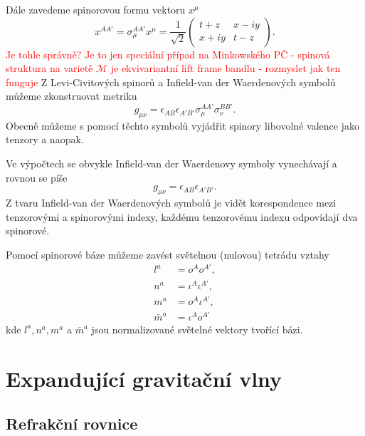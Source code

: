 Dále zavedeme spinorovou formu vektoru $x^\mu$
\begin{equation}
    x^{AA'} = \sigma_\mu^{AA'} x^\mu = \frac{1}{\sqrt{2}} \begin{pmatrix}
        t + z & x - iy \\
        x + iy & t - z
    \end{pmatrix}.
\end{equation}
\textcolor{red}{Je tohle správně? Je to jen speciální případ na Minkowského PČ - spinová
struktura na varietě $\mathcal{M}$ je ekvivariantní lift frame bandlu - rozmyslet jak ten
funguje}
Z Levi-Civitových spinorů a Infield-van der Waerdenových symbolů můžeme zkonstruovat metriku
\begin{equation}
    g_{\mu \nu} = \epsilon_{AB} \epsilon_{A'B'} \sigma_\mu^{AA'} \sigma_\nu^{BB'}.
\end{equation}
Obecně můžeme s pomocí těchto symbolů vyjádřit spinory libovolné valence jako tenzory a
naopak.

Ve výpočtech se obvykle Infield-van der Waerdenovy symboly vynechávají a rovnou se píše
\begin{equation}
    g_{\mu \nu} = \epsilon_{AB}\epsilon_{A'B'}.
\end{equation}
Z tvaru Infield-van der Waerdenových symbolů je vidět korespondence mezi tenzorovými a spinorovými indexy,
každému tenzorovému indexu odpovídají dva spinorové.

Pomocí spinorové báze můžeme zavést světelnou (nulovou) tetrádu vztahy
\begin{equation}
    \begin{split}
        l^a &= o^A o^{A'}, \\
        n^a &= \iota^A \iota^{A'}, \\
        m^a &= o^A \iota^{A'}, \\
        \bar{m}^a &= \iota^A o^{A'}
    \end{split}
\end{equation}
kde $l^a, n^a, m^a$ a $\bar{m}^a$ jsou normalizované světelné vektory tvořící bázi.



\section{Expandující gravitační vlny}




\subsection{Refrakční rovnice}